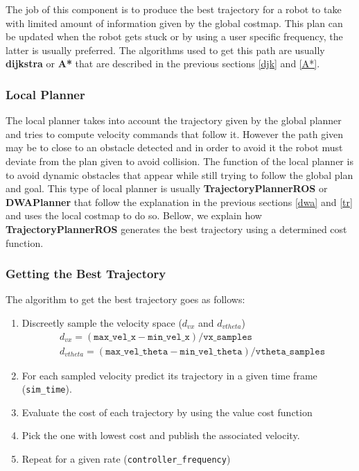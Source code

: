 The job of this component is to produce the best trajectory for a robot to take with limited amount of information given by the global costmap.
This plan can be updated when the robot gets stuck or by using a user specific frequency, the latter is usually preferred. The algorithms used to get this path are usually \textbf{dijkstra} or \textbf{A*} that are described in the previous sections \ref{djk} and \ref{A*}.

\subsubsection{Local Planner}
The local planner takes into account the trajectory given by the global planner and tries to compute velocity commands that follow it. However the path given may be to close to an obstacle detected and in order to avoid it the robot must deviate from the plan given to avoid collision. The function of the local planner is to avoid dynamic obstacles that appear while still trying to follow the global plan and goal. This type of local planner is usually \textbf{TrajectoryPlannerROS} or \textbf{DWAPlanner} that follow the explanation in the previous sections \ref{dwa} and \ref{tr} and uses the local costmap to do so. Bellow, we explain how \textbf{TrajectoryPlannerROS} generates the best trajectory using a determined cost function.

\subsubsection*{Getting the Best Trajectory}
The algorithm to get the best trajectory goes as follows:
\begin{enumerate}
    \item Discreetly sample the velocity space ($d_{vx}$ and $d_{vtheta}$)
    \begin{align*}
        & d_{vx}=(\texttt{max\_vel\_x}-\texttt{min\_vel\_x})/\texttt{vx\_samples}\\
         & d_{vtheta}=(\texttt{max\_vel\_theta}-\texttt{min\_vel\_theta})/\texttt{vtheta\_samples}
    \end{align*}
    \item For each sampled velocity predict its trajectory in a given time frame (\texttt{sim\_time}).
    \item Evaluate the cost of each trajectory  by using the value cost function
    \item Pick the one with lowest cost and publish the associated velocity.
    \item Repeat for a given rate (\texttt{controller\_frequency})
\end{enumerate}
